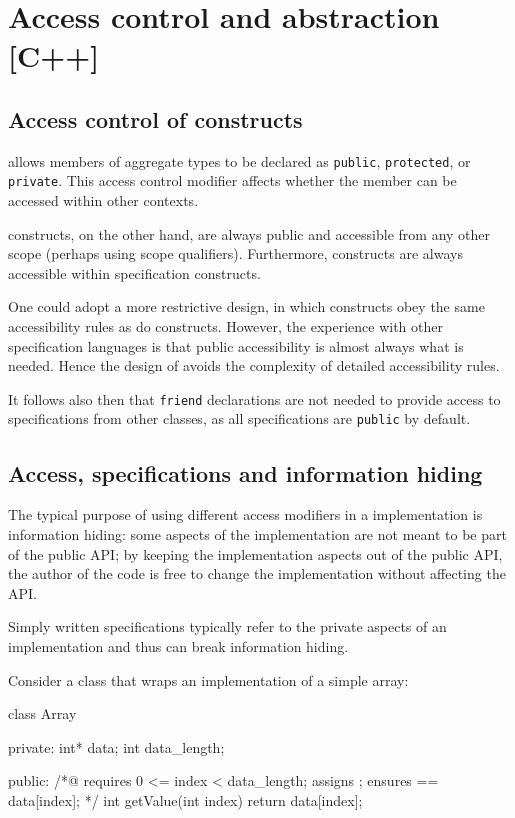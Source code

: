 \section{Access control and abstraction [C++]}
\label{sec:access}

\subsection{Access control of \NAME constructs}

\lang allows members of aggregate types to be declared as \lstinline|public|, \lstinline|protected|, or \lstinline|private|. This access control modifier affects whether the member can be accessed within other contexts. 

\NAME constructs, on the other hand, are always public and accessible from any other scope (perhaps using scope qualifiers). 
Furthermore, \lang constructs are always accessible within \NAME
specification constructs.

One could adopt a more restrictive design, in which \NAME constructs
obey the same accessibility rules as do \lang constructs. 
However, the experience with other specification languages is that 
public accessibility is almost always what is needed. Hence the design
of \NAME avoids the complexity of detailed accessibility rules.

It follows also then that \lstinline|friend| declarations are not 
needed to provide access to \NAME specifications from other classes,
as all specifications are \lstinline|public| by default.
 
\subsection{Access, specifications and information hiding}
\label{sec:infohiding}

The typical purpose of using different access modifiers in a
\lang implementation is information hiding: some aspects of
the implementation are not meant to be part of the public API;
by keeping the implementation aspects out of the public API, the
author of the code is free to change the implementation without
affecting the API.

Simply written specifications typically refer to the private
aspects of an implementation and thus can break information hiding.

Consider a class that wraps an implementation of a simple array:

\begin{listing-nonumber}
class Array {
  private:
	int* data;
	int data_length;

  public:
	/*@ 
	requires 0 <= index < data_length;
	assigns \nothing;
	ensures \result == data[index];
	*/
	int getValue(int index) {
		return data[index];
	}
}
\end{listing-nonumber}

